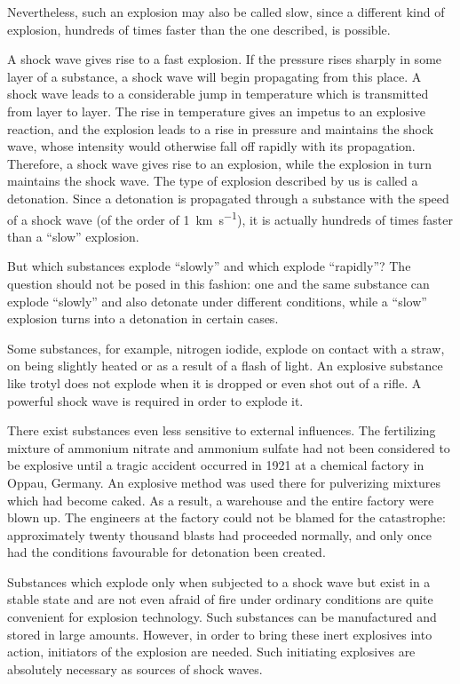 Nevertheless, such an explosion may also be called slow, since a different kind of explosion, hundreds of times faster than the one described, is possible.

A shock wave gives rise to a fast explosion. If the pres­sure rises sharply in some layer of a substance, a shock wave will begin propagating from this place. A shock wave leads to a considerable jump in temperature which is transmitted from layer to layer. The rise in tempera­ture gives an impetus to an explosive reaction, and the explosion leads to a rise in pressure and maintains the shock wave, whose intensity would otherwise fall off rapidly with its propagation. Therefore, a shock wave gives rise to an explosion, while the explosion in turn maintains the shock wave. The type of explosion described by us is called a detonation. Since a detonation is propagated through a substance with the speed of a shock wave (of the order of \SI{1}{\kilo\meter\per\second}), it is actually hundreds of times faster than a ``slow'' explosion.\label{explosion}

But which substances explode ``slowly'' and which explode ``rapidly''? The question should not be posed in this fashion: one and the same substance can explode “slowly” and also detonate under different conditions, while a “slow” explosion turns into a detonation in cer­tain cases.

Some substances, for example, nitrogen iodide, explode on contact with a straw, on being slightly heated or as a result of a flash of light. An explosive substance like trotyl does not explode when it is dropped or even shot out of a rifle. A powerful shock wave is required in order to explode it.


There exist substances even less sensitive to external influences. The fertilizing mixture of ammonium nitrate and ammonium sulfate had not been considered to be explosive until a tragic accident occurred in 1921 at a chemical factory in Oppau, Germany. An explosive meth­od was used there for pulverizing mixtures which had become caked. As a result, a warehouse and the entire factory were blown up. The engineers at the factory could not be blamed for the catastrophe: approximately twen­ty thousand blasts had proceeded normally, and only once had the conditions favourable for detonation been creat­ed.

Substances which explode only when subjected to a shock wave but exist in a stable state and are not even afraid of fire under ordinary conditions are quite conve­nient for explosion technology. Such substances can be manufactured and stored in large amounts. However, in order to bring these inert explosives into action, initia­tors of the explosion are needed. Such initiating explo­sives are absolutely necessary as sources of shock waves.

